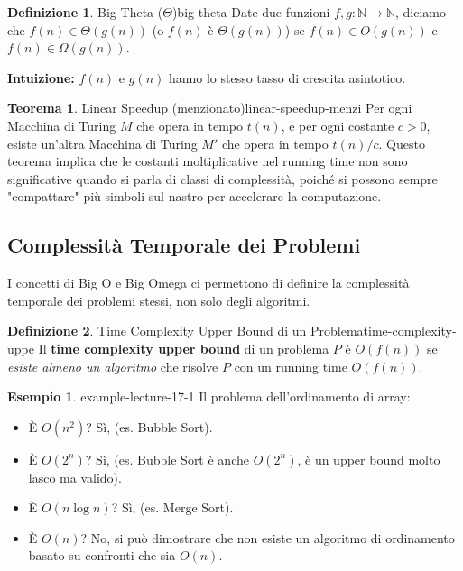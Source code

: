 \documentclass[a4paper]{article}
\theoremstyle{definition} %
\newtheorem{theorem}{Teorema}
\newtheorem{definition}{Definizione}[section]
\newtheorem{example}{Esempio}[section]
\begin{document}
\begin{definition}{Big Theta ($\Theta$)}{big-theta}
Date due funzioni $f, g: \mathbb{N} \to \mathbb{N}$, diciamo che $f(n) \in \Theta(g(n))$ (o $f(n)$ è $\Theta(g(n))$) se $f(n) \in O(g(n))$ e $f(n) \in \Omega(g(n))$.
\end{definition}
\textbf{Intuizione:} $f(n)$ e $g(n)$ hanno lo stesso tasso di crescita asintotico.

\begin{theorem}{Linear Speedup (menzionato)}{linear-speedup-menzi}
Per ogni Macchina di Turing $M$ che opera in tempo $t(n)$, e per ogni costante $c > 0$, esiste un'altra Macchina di Turing $M'$ che opera in tempo $t(n)/c$.
Questo teorema implica che le costanti moltiplicative nel running time non sono significative quando si parla di classi di complessità, poiché si possono sempre "compattare" più simboli sul nastro per accelerare la computazione.
\end{theorem}

\subsection{Complessità Temporale dei Problemi}
I concetti di Big O e Big Omega ci permettono di definire la complessità temporale dei problemi stessi, non solo degli algoritmi.

\begin{definition}{Time Complexity Upper Bound di un Problema}{time-complexity-uppe}
Il \textbf{time complexity upper bound} di un problema $P$ è $O(f(n))$ se \emph{esiste almeno un algoritmo} che risolve $P$ con un running time $O(f(n))$.
\end{definition}
\begin{example}{}{{ example-lecture-17-1 }}
Il problema dell'ordinamento di array:
\begin{itemize}
    \item È $O(n^2)$? Sì, (es. Bubble Sort).
    \item È $O(2^n)$? Sì, (es. Bubble Sort è anche $O(2^n)$, è un upper bound molto lasco ma valido).
    \item È $O(n \log n)$? Sì, (es. Merge Sort).
    \item È $O(n)$? No, si può dimostrare che non esiste un algoritmo di ordinamento basato su confronti che sia $O(n)$.
\end{itemize}
\end{example}
\end{document}
